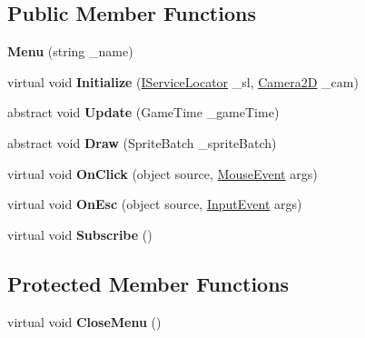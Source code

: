 \subsection*{Public Member Functions}
\begin{DoxyCompactItemize}
\item 
\mbox{\label{class_g_m_t_b_1_1_abstracts_1_1_menu_a8026ed332b2eea8bc1cd368cd41a88cc}} 
{\bfseries Menu} (string \+\_\+name)
\item 
\mbox{\label{class_g_m_t_b_1_1_abstracts_1_1_menu_a99849940c5a13696321bdfe1862bcc98}} 
virtual void {\bfseries Initialize} (\mbox{\hyperlink{interface_g_m_t_b_1_1_interfaces_1_1_i_service_locator}{I\+Service\+Locator}} \+\_\+sl, \mbox{\hyperlink{class_g_m_t_b_1_1_camera2_d}{Camera2D}} \+\_\+cam)
\item 
\mbox{\label{class_g_m_t_b_1_1_abstracts_1_1_menu_aadc527a31a38cf4f758726a9b2e693fe}} 
abstract void {\bfseries Update} (Game\+Time \+\_\+game\+Time)
\item 
\mbox{\label{class_g_m_t_b_1_1_abstracts_1_1_menu_aba5b8bd09e1aa685e5c6fae0022b7b3d}} 
abstract void {\bfseries Draw} (Sprite\+Batch \+\_\+sprite\+Batch)
\item 
\mbox{\label{class_g_m_t_b_1_1_abstracts_1_1_menu_af78983cbc14d3363fae7eacebbad5118}} 
virtual void {\bfseries On\+Click} (object source, \mbox{\hyperlink{class_g_m_t_b_1_1_input_system_1_1_mouse_event}{Mouse\+Event}} args)
\item 
\mbox{\label{class_g_m_t_b_1_1_abstracts_1_1_menu_a1c436cd3077284fa855dba16c1dbdee3}} 
virtual void {\bfseries On\+Esc} (object source, \mbox{\hyperlink{class_g_m_t_b_1_1_input_system_1_1_input_event}{Input\+Event}} args)
\item 
\mbox{\label{class_g_m_t_b_1_1_abstracts_1_1_menu_a24d9eadd03549b0574847d51ed59b753}} 
virtual void {\bfseries Subscribe} ()
\end{DoxyCompactItemize}
\subsection*{Protected Member Functions}
\begin{DoxyCompactItemize}
\item 
\mbox{\label{class_g_m_t_b_1_1_abstracts_1_1_menu_adfaa1bb6c5c0e93394a66ed67419d13c}} 
virtual void {\bfseries Close\+Menu} ()
\end{DoxyCompactItemize}
